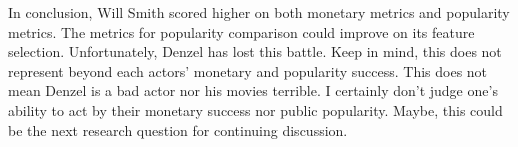 \documentclass[]{article}
\begin{document}
\noindent In conclusion, Will Smith scored higher on both monetary
metrics and popularity metrics. The metrics for popularity comparison
could improve on its feature selection. Unfortunately, Denzel has lost
this battle. Keep in mind, this does not represent beyond each actors'
monetary and popularity success. This does not mean Denzel is a bad
actor nor his movies terrible. I certainly don't judge one's ability to
act by their monetary success nor public popularity. Maybe, this could
be the next research question for continuing discussion. \vspace{0.25in}






\newpage
\theendnotes

\newpage
\begin{auxmulticols}{2}
\singlespacing 


\end{auxmulticols}

\newpage
{
\hypersetup{linkcolor=black}
\setcounter{tocdepth}{3}
\tableofcontents
}
\end{document}
